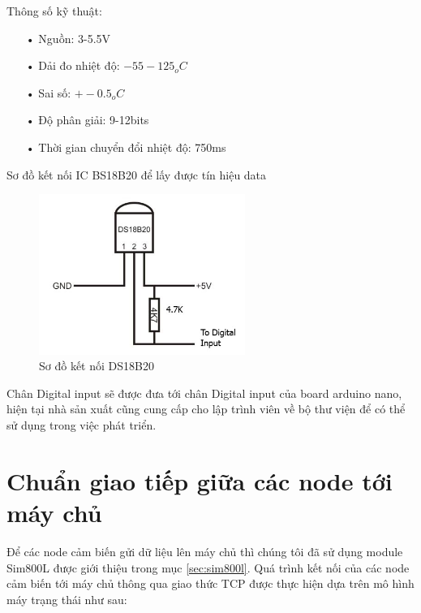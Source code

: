 Thông số kỹ thuật:
\begin{itemize}
\item[•]Nguồn: 3-5.5V
\item[•]Dải đo nhiệt độ: $-55 -125_{o}C$
\item[•]Sai số: $+-0.5_{o}C$
\item[•]Độ phân giải: 9-12bits
\item[•]Thời gian chuyển đổi nhiệt độ: 750ms
\end{itemize}
Sơ đồ kết nối IC BS18B20 để lấy được tín hiệu data
\begin{figure}[H]
	\centering    
	\includegraphics[width=0.6\textwidth]{ds18b20_ketnoi}
	\caption[Sơ đồ kết nối DS18B20]{Sơ đồ kết nối DS18B20}
	\label{fig: ds18b20_ketnoi}
\end{figure}
Chân Digital input sẽ được đưa tới chân Digital input của board arduino nano, hiện tại nhà sản xuất cũng cung cấp cho lập trình viên về bộ thư viện để có thể sử dụng trong việc phát triển.

\newpage


\section{Chuẩn giao tiếp giữa các node tới máy chủ}
Để các node cảm biến gửi dữ liệu lên máy chủ thì chúng tôi đã sử dụng module Sim800L được giới thiệu trong mục \ref{sec:sim800l}. Quá trình kết nối của các node cảm biến tới máy chủ thông qua giao thức TCP được thực hiện dựa trên mô hình máy trạng thái như sau:


